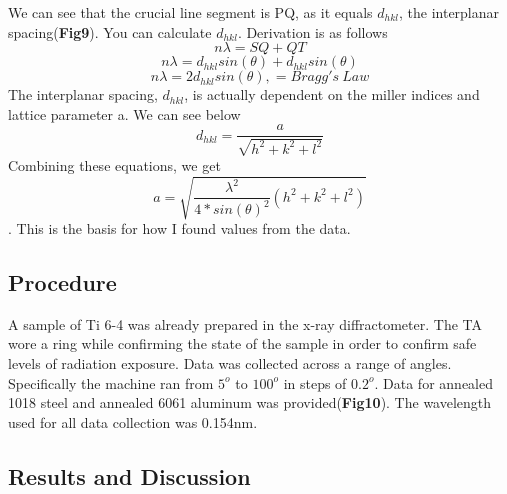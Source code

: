\documentclass{article}
\begin{document}
We can see that the crucial line segment is PQ, as it equals $d_{hkl}$, the interplanar spacing(\textbf{Fig9}). You can calculate $d_{hkl}$. Derivation is as follows
$$n\lambda = SQ + QT$$
$$n\lambda = d_{hkl}sin(\theta ) + d_{hkl}sin(\theta )$$
$$n\lambda = 2d_{hkl}sin(\theta ), = Bragg's\ Law$$
The interplanar spacing, $d_{hkl}$, is actually dependent on the miller indices and lattice parameter a. We can see below
$$d_{hkl} = \frac{a}{\sqrt{h^2+k^2+l^2}}$$
Combining these equations, we get
$$a = \sqrt{\frac{\lambda ^2}{4*sin(\theta)^2}(h^2+k^2+l^2)}$$.
This is the basis for how I found values from the data.

\subsection{Procedure}

A sample of Ti 6-4 was already prepared in the x-ray diffractometer. The TA wore a ring while confirming the state of the sample in order to confirm safe levels of radiation exposure. Data was collected across a range of angles. Specifically the machine ran from $5^o$ to $100^o$ in steps of $0.2^o$. Data for annealed 1018 steel and annealed 6061 aluminum was provided(\textbf{Fig10}). The wavelength used for all data collection was 0.154nm.

\subsection{Results and Discussion}
\end{document}
